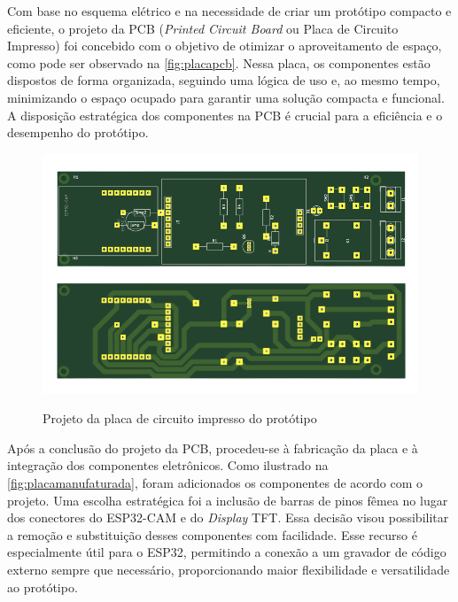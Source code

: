 Com base no esquema elétrico e na necessidade de criar um protótipo 
compacto e eficiente, o projeto da PCB (\textit{Printed Circuit Board} ou 
Placa de Circuito Impresso) foi concebido com o objetivo de otimizar 
o aproveitamento de espaço, como pode ser observado na \autoref{fig:placapcb}. 
Nessa placa, os componentes estão dispostos de forma organizada, 
seguindo uma lógica de uso e, ao mesmo tempo, minimizando o espaço 
ocupado para garantir uma solução compacta e funcional. A disposição 
estratégica dos componentes na PCB é crucial para a eficiência e o 
desempenho do protótipo.

\begin{figure}[h!]
    \centering
    \caption{Projeto da placa de circuito impresso do protótipo}
    \includegraphics[scale=0.25]{figuras/placa_pcb.png}
    \fonte{}%
    \label{fig:placapcb}
    \centering
\end{figure}

Após a conclusão do projeto da PCB, procedeu-se à fabricação da placa e 
à integração dos componentes eletrônicos. Como ilustrado na \autoref{fig:placamanufaturada}, 
foram adicionados os componentes de acordo com o projeto. Uma escolha 
estratégica foi a inclusão de barras de pinos fêmea no lugar dos 
conectores do ESP32-CAM e do \textit{Display} TFT. Essa decisão visou 
possibilitar a remoção e substituição desses componentes com 
facilidade. Esse recurso é especialmente útil para o ESP32, 
permitindo a conexão a um gravador de código externo sempre 
que necessário, proporcionando maior flexibilidade e 
versatilidade ao protótipo.

